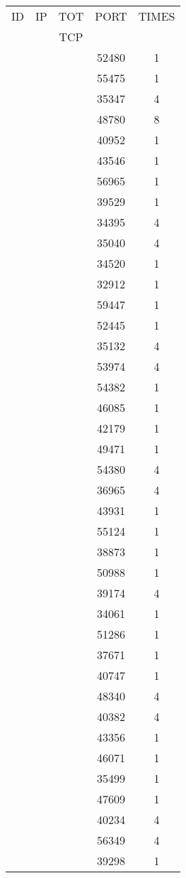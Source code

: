 \documentclass[a4paper]{scrartcl}
\begin{document}
\begin{minipage}[b]{0.5\linewidth}
\begin{tabular}{| c | c | c | c | c |}
\hline
ID & IP & TOT & PORT & TIMES \\ 
   &    & TCP &      &       \\ 
\hline
& & & 52480 & 1 \\ & & & 55475 & 1 \\ & & & 35347 & 4 \\ & & & 48780 & 8 \\ & & & 40952 & 1 \\ & & & 43546 & 1 \\ & & & 56965 & 1 \\ & & & 39529 & 1 \\ & & & 34395 & 4 \\ & & & 35040 & 4 \\ & & & 34520 & 1 \\ & & & 32912 & 1 \\ & & & 59447 & 1 \\ & & & 52445 & 1 \\ & & & 35132 & 4 \\ & & & 53974 & 4 \\ & & & 54382 & 1 \\ & & & 46085 & 1 \\ & & & 42179 & 1 \\ & & & 49471 & 1 \\ & & & 54380 & 4 \\ & & & 36965 & 4 \\ & & & 43931 & 1 \\ & & & 55124 & 1 \\ & & & 38873 & 1 \\ & & & 50988 & 1 \\ & & & 39174 & 4 \\ & & & 34061 & 1 \\ & & & 51286 & 1 \\ & & & 37671 & 1 \\ & & & 40747 & 1 \\ & & & 48340 & 4 \\ & & & 40382 & 4 \\ & & & 43356 & 1 \\ & & & 46071 & 1 \\ & & & 35499 & 1 \\ & & & 47609 & 1 \\ & & & 40234 & 4 \\ & & & 56349 & 4 \\ & & & 39298 & 1 \\ \hline\end{tabular}\end{minipage} \hfill\begin{minipage}[b]{0.5\linewidth}\begin{tabular}{| c | c | c | c | c |}

\end{tabular}
\end{minipage}
\end{document}
